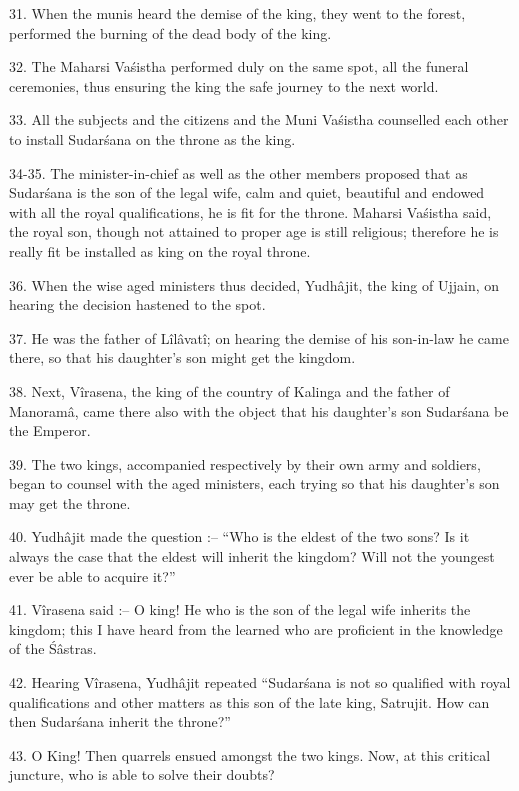 31. When the munis heard the demise of the king, they went to the forest, performed the burning of the dead body of the king.

32. The Maharsi Va\'sistha performed duly on the same spot, all the funeral ceremonies, thus ensuring the king the safe journey to the next world.

33. All the subjects and the citizens and the Muni Va\'sistha counselled each other to install Sudar\'sana on the throne as the king.

34-35. The minister-in-chief as well as the other members proposed that as Sudar\'sana is the son of the legal wife, calm and quiet, beautiful and endowed with all the royal qualifications, he is fit for the throne. Maharsi Va\'sistha said, the royal son, though not attained to proper age is still religious; therefore he is really fit be installed as king on the royal throne.

36. When the wise aged ministers thus decided, Yudh\^ajit, the king of Ujjain, on hearing the decision hastened to the spot.

37. He was the father of L\^il\^avat\^i; on hearing the demise of his son-in-law he came there, so that his daughter's son might get the kingdom.

38. Next, V\^irasena, the king of the country of Kalinga and the father of Manoram\^a, came there also with the object that his daughter's son Sudar\'sana be the Emperor.

39. The two kings, accompanied respectively by their own army and soldiers, began to counsel with the aged ministers, each trying so that his daughter's son may get the throne.

40. Yudh\^ajit made the question :-- ``Who is the eldest of the two sons? Is it always the case that the eldest will inherit the kingdom? Will not the youngest ever be able to acquire it?''

41. V\^irasena said :-- O king! He who is the son of the legal wife inherits the kingdom; this I have heard from the learned who are proficient in the knowledge of the \'S\^astras.

42. Hearing V\^irasena, Yudh\^ajit repeated ``Sudar\'sana is not so qualified with royal qualifications and other matters as this son of the late king, Satrujit. How can then Sudar\'sana inherit the throne?''

43. O King! Then quarrels ensued amongst the two kings. Now, at this critical juncture, who is able to solve their doubts?

